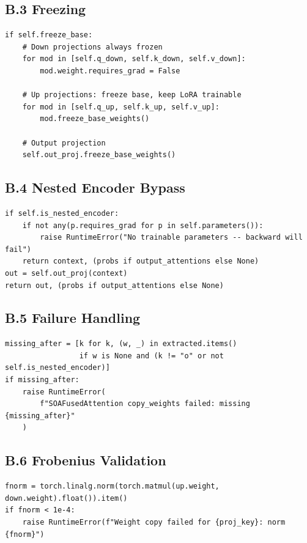 \subsection{B.3 Freezing}

\begin{lstlisting}
if self.freeze_base:
    # Down projections always frozen
    for mod in [self.q_down, self.k_down, self.v_down]:
        mod.weight.requires_grad = False
    
    # Up projections: freeze base, keep LoRA trainable
    for mod in [self.q_up, self.k_up, self.v_up]:
        mod.freeze_base_weights()
    
    # Output projection
    self.out_proj.freeze_base_weights()
\end{lstlisting}

\subsection{B.4 Nested Encoder Bypass}

\begin{lstlisting}
if self.is_nested_encoder:
    if not any(p.requires_grad for p in self.parameters()):
        raise RuntimeError("No trainable parameters -- backward will fail")
    return context, (probs if output_attentions else None)
out = self.out_proj(context)
return out, (probs if output_attentions else None)
\end{lstlisting}

\subsection{B.5 Failure Handling}

\begin{lstlisting}
missing_after = [k for k, (w, _) in extracted.items() 
                 if w is None and (k != "o" or not self.is_nested_encoder)]
if missing_after:
    raise RuntimeError(
        f"SOAFusedAttention copy_weights failed: missing {missing_after}"
    )
\end{lstlisting}

\subsection{B.6 Frobenius Validation}

\begin{lstlisting}
fnorm = torch.linalg.norm(torch.matmul(up.weight, down.weight).float()).item()
if fnorm < 1e-4:
    raise RuntimeError(f"Weight copy failed for {proj_key}: norm {fnorm}")
\end{lstlisting}

